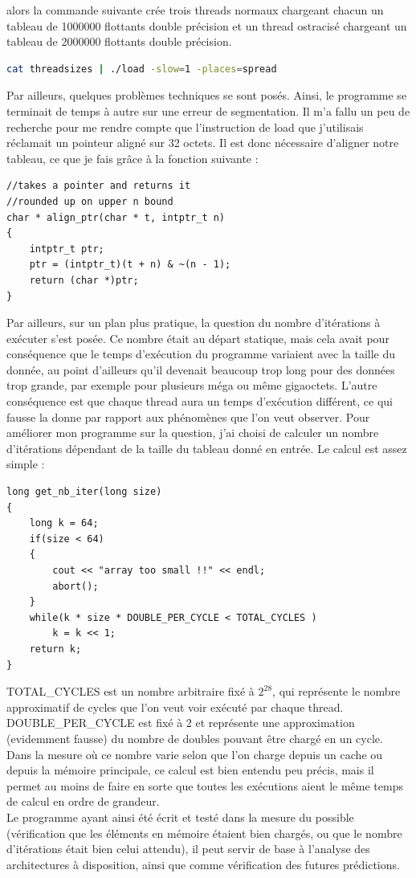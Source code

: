 \documentclass{report}
\begin{document}
alors la commande suivante crée trois threads normaux chargeant chacun un tableau de 1000000 flottants
double précision et un thread ostracisé chargeant un tableau de 2000000 flottants double précision.
\begin{lstlisting}[language=bash]
cat threadsizes | ./load -slow=1 -places=spread
\end{lstlisting}
Par ailleurs, quelques problèmes techniques se sont posés. Ainsi, le programme se terminait de temps à 
autre sur une erreur de segmentation. Il m'a fallu un peu de recherche pour me rendre compte que 
l'instruction de load que j'utilisais réclamait un pointeur aligné sur 32 octets. Il est donc nécessaire d'aligner notre tableau, ce que je fais grâce à la fonction suivante : 
\begin{lstlisting}
//takes a pointer and returns it
//rounded up on upper n bound
char * align_ptr(char * t, intptr_t n)
{
	intptr_t ptr;
	ptr = (intptr_t)(t + n) & ~(n - 1);
	return (char *)ptr;
}
\end{lstlisting}
Par ailleurs, sur un plan plus pratique, la question du nombre d'itérations à exécuter s'est posée. Ce 
nombre était au départ statique, mais cela avait pour conséquence que le temps d'exécution du programme
variaient avec la taille du donnée, au point d'ailleurs qu'il devenait beaucoup trop long pour des 
données trop grande, par exemple pour plusieurs méga ou même gigaoctets. L'autre conséquence est 
que chaque thread aura un temps d'exécution différent, ce qui fausse la donne par rapport aux
phénomènes que l'on veut observer. Pour améliorer mon programme sur la question, j'ai choisi 
de calculer un nombre d'itérations dépendant de la taille du tableau donné en entrée. Le 
calcul est assez simple : 
\begin{lstlisting}
long get_nb_iter(long size)
{
	long k = 64;
	if(size < 64)
	{
		cout << "array too small !!" << endl;
		abort();
	}
	while(k * size * DOUBLE_PER_CYCLE < TOTAL_CYCLES )
		k = k << 1;
	return k;
}
\end{lstlisting}
TOTAL\_CYCLES est un nombre arbitraire fixé à $2^{28}$, qui représente le nombre approximatif de cycles
que l'on veut voir exécuté par chaque thread. DOUBLE\_PER\_CYCLE est fixé à 2 et représente une 
approximation (evidemment fausse) du nombre de doubles pouvant être chargé en un cycle. Dans la mesure
où ce nombre varie selon que l'on charge depuis un cache ou depuis la mémoire principale, ce calcul
est bien entendu peu précis, mais il permet au moins de faire en sorte que toutes les exécutions aient
le même temps de calcul en ordre de grandeur. 
\\Le programme ayant ainsi été écrit et testé dans la mesure du possible (vérification que les éléments
en mémoire étaient bien chargés, ou que le nombre d'itérations était bien celui attendu), il peut 
servir de base à l'analyse des architectures à disposition, ainsi que comme vérification des futures
prédictions. 
\end{document}
